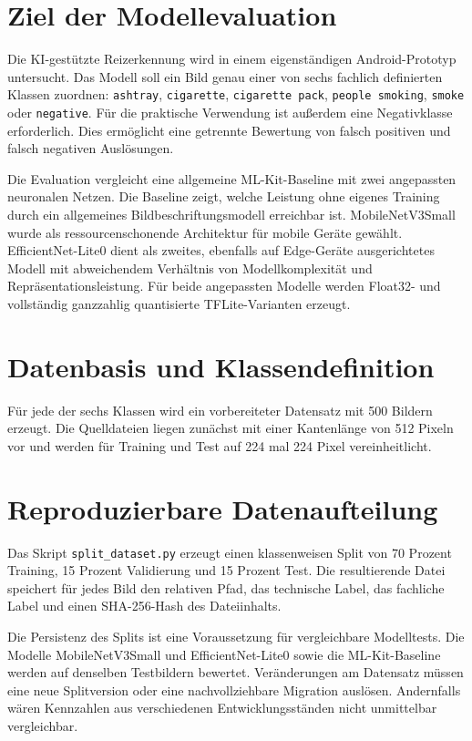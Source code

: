 
\section{Ziel der Modellevaluation}
Die KI-gestützte Reizerkennung wird in einem eigenständigen Android-Prototyp untersucht. Das Modell soll ein Bild genau einer von sechs fachlich definierten Klassen zuordnen: \texttt{ashtray}, \texttt{cigarette}, \texttt{cigarette pack}, \texttt{people smoking}, \texttt{smoke} oder \texttt{negative}. Für die praktische Verwendung ist außerdem eine Negativklasse erforderlich. Dies ermöglicht eine getrennte Bewertung von falsch positiven und falsch negativen Auslösungen.

Die Evaluation vergleicht eine allgemeine ML-Kit-Baseline mit zwei angepassten neuronalen Netzen. Die Baseline zeigt, welche Leistung ohne eigenes Training durch ein allgemeines Bildbeschriftungsmodell erreichbar ist. MobileNetV3Small wurde als ressourcenschonende Architektur für mobile Geräte gewählt. EfficientNet-Lite0 dient als zweites, ebenfalls auf Edge-Geräte ausgerichtetes Modell mit abweichendem Verhältnis von Modellkomplexität und Repräsentationsleistung. Für beide angepassten Modelle werden Float32- und vollständig ganzzahlig quantisierte TFLite-Varianten erzeugt.

\section{Datenbasis und Klassendefinition}
Für jede der sechs Klassen wird ein vorbereiteter Datensatz mit 500 Bildern erzeugt. Die Quelldateien liegen zunächst mit einer Kantenlänge von 512 Pixeln vor und werden für Training und Test auf 224 mal 224 Pixel vereinheitlicht.

\section{Reproduzierbare Datenaufteilung}
Das Skript \texttt{split\_dataset.py} erzeugt einen klassenweisen Split von 70 Prozent Training, 15 Prozent Validierung und 15 Prozent Test. Die resultierende Datei  speichert für jedes Bild den relativen Pfad, das technische Label, das fachliche Label und einen SHA-256-Hash des Dateiinhalts.

Die Persistenz des Splits ist eine Voraussetzung für vergleichbare Modelltests. Die Modelle MobileNetV3Small und EfficientNet-Lite0 sowie die ML-Kit-Baseline werden auf denselben Testbildern bewertet. Veränderungen am Datensatz müssen eine neue Splitversion oder eine nachvollziehbare Migration auslösen. Andernfalls wären Kennzahlen aus verschiedenen Entwicklungsständen nicht unmittelbar vergleichbar.

